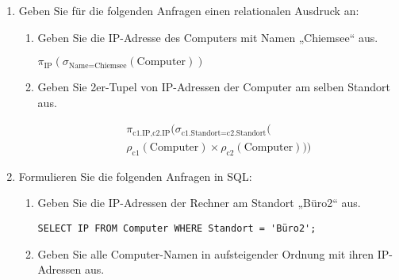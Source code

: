\documentclass{bschlangaul-aufgabe}
\begin{document}
\begin{enumerate}


\item Geben Sie für die folgenden Anfragen einen relationalen Ausdruck
an:

\begin{enumerate}


\item Geben Sie die IP-Adresse des Computers mit Namen „Chiemsee“ aus.

\begin{bAntwort}
$\pi_{\text{IP}}(\sigma_{\text{Name} = \text{Chiemsee}}(\text{Computer}))$
\end{bAntwort}


\item Geben Sie 2er-Tupel von IP-Adressen der Computer am selben
Standort aus.

\begin{bAntwort}
\begin{multline*}
\pi_{\text{c1.IP},\text{c2.IP}}(
  \sigma_{\text{c1.Standort} = \text{c2.Standort}}(\\
    \rho_{\text{c1}} (\text{Computer})
    \times
    \rho_{\text{c2}} (\text{Computer})
  )
)
\end{multline*}
\end{bAntwort}
\end{enumerate}


\item Formulieren Sie die folgenden Anfragen in SQL:

\begin{enumerate}


\item Geben Sie die IP-Adressen der Rechner am Standort „Büro2“ aus.

\begin{bAntwort}
\begin{verbatim}
SELECT IP FROM Computer WHERE Standort = 'Büro2';
\end{verbatim}
\end{bAntwort}


\item Geben Sie alle Computer-Namen in aufsteigender Ordnung mit ihren
IP-Adressen aus.


\end{enumerate}
\end{enumerate}
\end{document}

